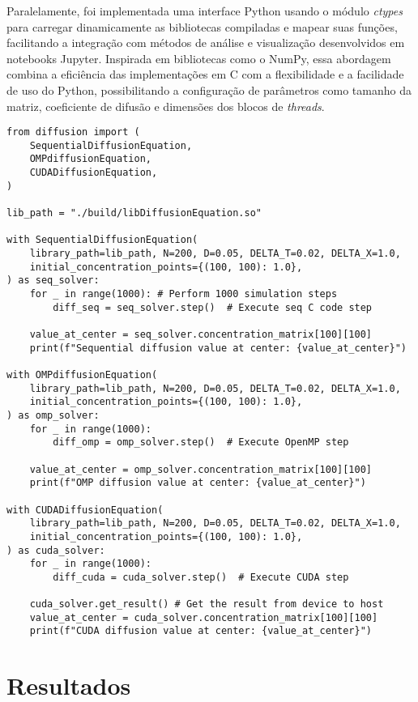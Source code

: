 \documentclass[12pt]{article}
\begin{document}
Paralelamente, foi implementada uma interface Python usando o módulo
\textit{ctypes} para carregar dinamicamente as bibliotecas compiladas e mapear
suas funções, facilitando a integração com métodos de análise e visualização
desenvolvidos em notebooks Jupyter. Inspirada em bibliotecas como o NumPy, essa
abordagem combina a eficiência das implementações em C com a flexibilidade e a
facilidade de uso do Python, possibilitando a configuração de parâmetros como
tamanho da matriz, coeficiente de difusão e dimensões dos blocos de
\textit{threads}.

\begin{lstlisting}[style=PythonStyle, caption={Interface Python para a simulação das equações de difusão.}, label={cod:pythonlib}]
from diffusion import (
    SequentialDiffusionEquation,
    OMPdiffusionEquation,
    CUDADiffusionEquation,
)

lib_path = "./build/libDiffusionEquation.so"

with SequentialDiffusionEquation(
    library_path=lib_path, N=200, D=0.05, DELTA_T=0.02, DELTA_X=1.0,
    initial_concentration_points={(100, 100): 1.0},
) as seq_solver:
    for _ in range(1000): # Perform 1000 simulation steps
        diff_seq = seq_solver.step()  # Execute seq C code step
    
    value_at_center = seq_solver.concentration_matrix[100][100]
    print(f"Sequential diffusion value at center: {value_at_center}")

with OMPdiffusionEquation(
    library_path=lib_path, N=200, D=0.05, DELTA_T=0.02, DELTA_X=1.0,
    initial_concentration_points={(100, 100): 1.0},
) as omp_solver:
    for _ in range(1000):
        diff_omp = omp_solver.step()  # Execute OpenMP step
    
    value_at_center = omp_solver.concentration_matrix[100][100]
    print(f"OMP diffusion value at center: {value_at_center}")

with CUDADiffusionEquation(
    library_path=lib_path, N=200, D=0.05, DELTA_T=0.02, DELTA_X=1.0,
    initial_concentration_points={(100, 100): 1.0},
) as cuda_solver:
    for _ in range(1000):
        diff_cuda = cuda_solver.step()  # Execute CUDA step
    
    cuda_solver.get_result() # Get the result from device to host
    value_at_center = cuda_solver.concentration_matrix[100][100]
    print(f"CUDA diffusion value at center: {value_at_center}")
\end{lstlisting}

\section{Resultados}
\end{document}
